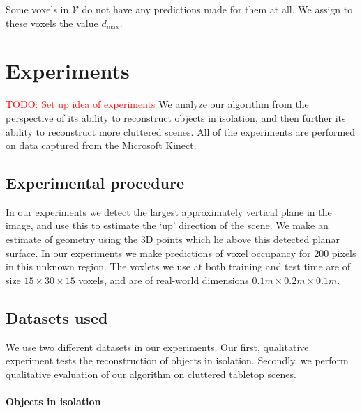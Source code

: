 \documentclass[10pt,twocolumn,letterpaper]{article}
\newcommand{\voxelgrid}{\mathcal{V}}
\newcommand{\todo}[1]{\textcolor{red}{TODO: #1}}
\begin{document}
Some voxels in $\voxelgrid$ do not have any predictions made for them at all. 
We assign to these voxels the value $d_{\max}$.



\section{Experiments}

\todo{Set up idea of experiments}
We analyze our algorithm from the perspective of its ability to reconstruct objects in isolation, and then further its ability to reconstruct more cluttered scenes.
All of the experiments are performed on data captured from the Microsoft Kinect.

\subsection{Experimental procedure}

In our experiments we detect the largest approximately vertical plane in the image, and use this to estimate the `up' direction of the scene.
We make an estimate of geometry using the 3D points which lie above this detected planar surface.
In our experiments we make predictions of voxel occupancy for 200 pixels in this unknown region.
The voxlets we use at both training and test time are of size $15 \times 30 \times 15$ voxels, and are of real-world dimensions $0.1m \times 0.2m \times 0.1m$.

\subsection{Datasets used}

We use two different datasets in our experiments.
Our first, qualitative experiment tests the reconstruction of objects in isolation.
Secondly, we perform qualitative evaluation of our algorithm on cluttered tabletop scenes.

\paragraph{Objects in isolation}
\end{document}
